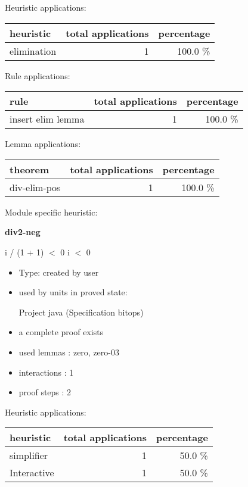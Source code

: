 \documentclass[a4paper]{article}
\begin{document}
\medskip


Heuristic applications:

\begin{supertabular}{l|r|r}
heuristic	& total applications & percentage \\ \hline
elimination & 1 & 100.0 \% \\

\end{supertabular}

Rule applications:

\begin{supertabular}{l|r|r}
rule	        & total applications & percentage \\ \hline
insert elim lemma & 1 & 100.0 \% \\

\end{supertabular}

Lemma applications:

\begin{supertabular}{l|r|r}
theorem	        & total applications & percentage \\ \hline
div-elim-pos & 1 & 100.0 \% \\

\end{supertabular}

Module specific heuristic:

\pagebreak

{\LARGE\bf div2-neg}\label{lemma-div2-neg}

\medskip

 \Fol i / (1 + 1) $<$ 0 \Imp i $<$ 0

\begin{itemize}

\item Type: created by user

\item used by units in proved state:

Project java (Specification bitops)
\item       a complete proof exists
\item       used lemmas  : zero, zero-03
\item       interactions : 1
\item       proof steps  : 2
\end{itemize}

\medskip


Heuristic applications:

\begin{supertabular}{l|r|r}
heuristic	& total applications & percentage \\ \hline
simplifier & 1 & 50.0 \% \\
Interactive & 1 & 50.0 \% \\

\end{supertabular}
\end{document}
